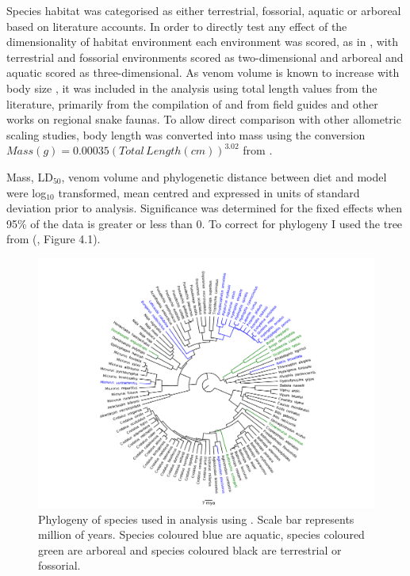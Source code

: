 Species habitat was categorised as either terrestrial, fossorial, aquatic or arboreal based on literature accounts. In order to directly test any effect of the dimensionality of habitat environment each environment was scored, as in \cite{pawar2012dimensionality}, with terrestrial and fossorial environments scored as two-dimensional and arboreal and aquatic scored as three-dimensional.
As venom volume is known to increase with body size \citep{mirtschin2002influences}, it was included in the analysis using total length values from the literature, primarily from the compilation of \citep{boback2003empirical} and from field guides and other works on regional snake faunas. To allow direct comparison with other allometric scaling studies, body length was converted into mass using the conversion $Mass (g) = 0.00035({Total\,Length(cm)})^{3.02}$ from \cite{pough1980advantages}.


Mass, LD$_{50}$, venom volume and phylogenetic distance between diet and model were log$_{10}$ transformed, mean centred and expressed in units of standard deviation prior to analysis. Significance was determined for the fixed effects when 95\% of the data is greater or less than 0. To correct for phylogeny I used the tree from (\cite{pyron2014early}, Figure 4.1). 


\begin{figure}[h]
  \centering
  \includegraphics[width=.95\textwidth]{ch4-snakes/fig1_snake_phylo.pdf}%
  \caption[ ]{Phylogeny of species used in analysis using \cite{pyron2014early}. Scale bar represents million of years. Species coloured blue are aquatic, species coloured green are arboreal and species coloured black are terrestrial or fossorial.}
  \label{fig:Figure 4.1.}
\end{figure}


